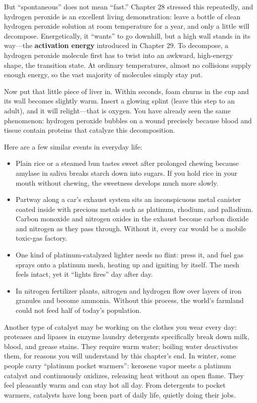 But ``spontaneous'' does not mean ``fast.'' Chapter 28 stressed this repeatedly, and hydrogen peroxide is an excellent living demonstration: leave a bottle of clean hydrogen peroxide solution at room temperature for a year, and only a little will decompose. Energetically, it ``wants'' to go downhill, but a high wall stands in its way---the \textbf{activation energy} introduced in Chapter 29. To decompose, a hydrogen peroxide molecule first has to twist into an awkward, high-energy shape, the transition state. At ordinary temperatures, almost no collisions supply enough energy, so the vast majority of molecules simply stay put.

Now put that little piece of liver in. Within seconds, foam churns in the cup and its wall becomes slightly warm. Insert a glowing splint (leave this step to an adult), and it will relight---that is oxygen. You have already seen the same phenomenon: hydrogen peroxide bubbles on a wound precisely because blood and tissue contain proteins that catalyze this decomposition.

Here are a few similar events in everyday life:

\begin{itemize}[itemsep=2pt]
\item Plain rice or a steamed bun tastes sweet after prolonged chewing because amylase in saliva breaks starch down into sugars. If you hold rice in your mouth without chewing, the sweetness develops much more slowly.
\item Partway along a car's exhaust system sits an inconspicuous metal canister coated inside with precious metals such as platinum, rhodium, and palladium. Carbon monoxide and nitrogen oxides in the exhaust become carbon dioxide and nitrogen as they pass through. Without it, every car would be a mobile toxic-gas factory.
\item One kind of platinum-catalyzed lighter needs no flint: press it, and fuel gas sprays onto a platinum mesh, heating up and igniting by itself. The mesh feels intact, yet it ``lights fires'' day after day.
\item In nitrogen fertilizer plants, nitrogen and hydrogen flow over layers of iron granules and become ammonia. Without this process, the world's farmland could not feed half of today's population.
\end{itemize}

Another type of catalyst may be working on the clothes you wear every day: proteases and lipases in enzyme laundry detergents specifically break down milk, blood, and grease stains. They require warm water; boiling water deactivates them, for reasons you will understand by this chapter's end. In winter, some people carry ``platinum pocket warmers'': kerosene vapor meets a platinum catalyst and continuously oxidizes, releasing heat without an open flame. They feel pleasantly warm and can stay hot all day. From detergents to pocket warmers, catalysts have long been part of daily life, quietly doing their jobs.

